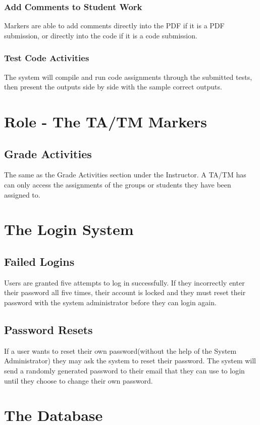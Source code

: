 \documentclass{article}
\begin{document}
\subsubsection{Add Comments to Student Work}
Markers are able to add comments directly into the PDF if it is a PDF submission,
or directly into the code if it is a code submission.
\subsubsection{Test Code Activities}
The system will compile and run code assignments through the submitted tests,
then present the outputs side by side with the sample correct outputs.

\section{Role - The TA/TM Markers \label{Marker}}
\subsection{Grade Activities}
The same as the Grade Activities section under the Instructor.
A TA/TM has can only access the assignments of the groups or students they
have been assigned to.

\section{The Login System}
\subsection{Failed Logins \label{loginSystem1}}
Users are granted five attempts to log in successfully.  If they incorrectly
enter their password all five times, their account is locked and they must reset
their password with the system administrator before they can login again.
\subsection{Password Resets \label{loginSystem2}}
If a user wants to reset their own password(without the help of the System
Administrator) they may ask the system to reset their password.  The system will
send a randomly generated password to their email that they can use to login
until they choose to change their own password.

\section{The Database}
\end{document}
